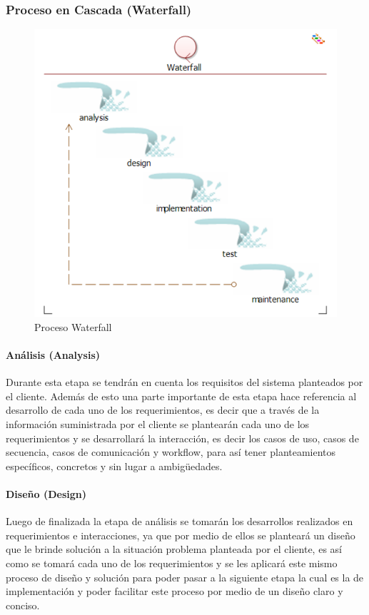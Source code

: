 \subsubsection{Proceso en Cascada (Waterfall)}
\begin{figure}[h]
	\centering
	\includegraphics[scale=0.7,]{imagenes/Metodologia/Waterfall.pdf}
	\caption{Proceso Waterfall}
	\label{fig:cronograma}
\end{figure}

\paragraph{Análisis (Analysis)}
Durante esta etapa se tendrán en cuenta los requisitos del sistema planteados por el cliente. Además de esto una parte importante de esta etapa hace referencia al desarrollo de cada uno de los requerimientos, es decir que a través de la información suministrada por el cliente se plantearán cada uno de los requerimientos y se desarrollará la interacción, es decir los casos de uso, casos de secuencia, casos de comunicación y workflow, para así tener planteamientos específicos, concretos y sin lugar a ambigüedades.

\paragraph{Diseño (Design)}
Luego de finalizada la etapa de análisis se tomarán los desarrollos realizados en requerimientos e interacciones, ya que por medio de ellos se planteará un diseño que le brinde solución a la situación problema planteada por el cliente, es así como se tomará cada uno de los requerimientos y se les aplicará este mismo proceso de diseño y solución para poder pasar a la siguiente etapa la cual es la de implementación y poder facilitar este proceso por medio de un diseño claro y conciso.

